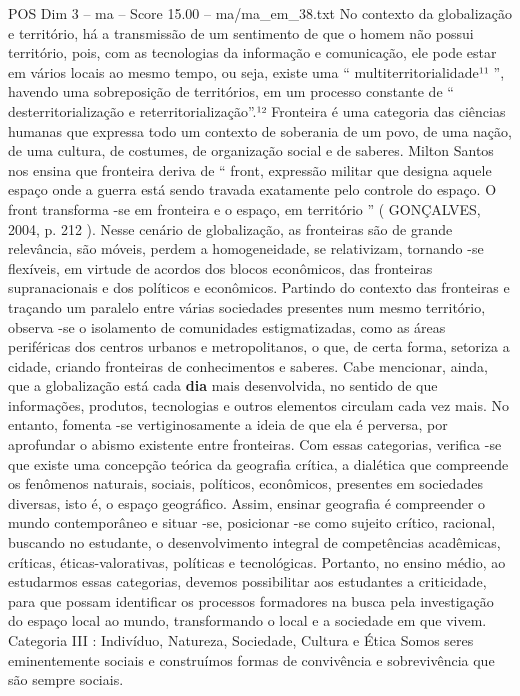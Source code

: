 \begin{textsample}{POS Dim 3 – ma – Score 15.00 – ma/ma\_em\_38.txt}
No contexto da globalização e território, há a transmissão de um sentimento de que o homem não possui território, pois, com as tecnologias da informação e comunicação, ele pode estar em vários locais ao mesmo tempo, ou seja, existe uma “ multiterritorialidade¹¹ ”, havendo uma sobreposição de territórios, em um processo constante de “ desterritorialização e reterritorialização”.¹² Fronteira é uma categoria das ciências humanas que expressa todo um contexto de soberania de um povo, de uma nação, de uma cultura, de costumes, de organização social e de saberes.
Milton Santos nos ensina que fronteira deriva de “ front, expressão militar que designa aquele espaço onde a guerra está sendo travada exatamente pelo controle do espaço.
O front transforma -se em fronteira e o espaço, em território ” ( GONÇALVES, 2004, p. 212 ).
Nesse cenário de globalização, as fronteiras são de grande relevância, são móveis, perdem a homogeneidade, se relativizam, tornando -se flexíveis, em virtude de acordos dos blocos econômicos, das fronteiras supranacionais e dos políticos e econômicos.
Partindo do contexto das fronteiras e traçando um paralelo entre várias sociedades presentes num mesmo território, observa -se o isolamento de comunidades estigmatizadas, como as áreas periféricas dos centros urbanos e metropolitanos, o que, de certa forma, setoriza a cidade, criando fronteiras de conhecimentos e saberes.
Cabe mencionar, ainda, que a globalização está cada \textbf{dia} mais desenvolvida, no sentido de que informações, produtos, tecnologias e outros elementos circulam cada vez mais.
No entanto, fomenta -se vertiginosamente a ideia de que ela é perversa, por aprofundar o abismo existente entre fronteiras.
Com essas categorias, verifica -se que existe uma concepção teórica da geografia crítica, a dialética que compreende os fenômenos naturais, sociais, políticos, econômicos, presentes em sociedades diversas, isto é, o espaço geográfico.
Assim, ensinar geografia é compreender o mundo contemporâneo e situar -se, posicionar -se como sujeito crítico, racional, buscando no estudante, o desenvolvimento integral de competências acadêmicas, críticas, éticas-valorativas, políticas e tecnológicas.
Portanto, no ensino médio, ao estudarmos essas categorias, devemos possibilitar aos estudantes a criticidade, para que possam identificar os processos formadores na busca pela investigação do espaço local ao mundo, transformando o local e a sociedade em que vivem.
Categoria III : Indivíduo, Natureza, Sociedade, Cultura e Ética Somos seres eminentemente sociais e construímos formas de convivência e sobrevivência que são sempre sociais.

\end{textsample}
